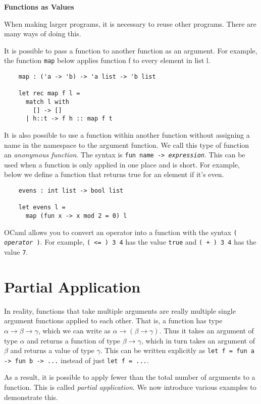 \documentclass[12pt]{article}
\begin{document}
\begin{center}\LARGE\bf
    Functions as Values
\end{center}

When making larger programs, it is necessary to reuse other programs. There are many ways of doing this.

It is possible to pass a function to another function as an argument. For example, the function \texttt{map}
below applies function f to every element in list l.
\begin{lstlisting}
    map : ('a -> 'b) -> 'a list -> 'b list

    let rec map f l =
      match l with
        [] -> []
      | h::t -> f h :: map f t
\end{lstlisting}

It is also possible to use a function within another function without assigning a name in the namespace to the argument function.
We call this type of function an \textit{anonymous function}. The syntax is
\texttt{fun name -> \textit{expression}}. This can be used when a function is only applied in one place and is
short. For example, below we define a function that returns true for an element if it's even.
\begin{lstlisting}
    evens : int list -> bool list

    let evens l =
      map (fun x -> x mod 2 = 0) l
\end{lstlisting}

OCaml allows you to convert an operator into a function with the syntax \texttt{( \textit{operator} )}. For example,
\texttt{( <= ) 3 4} has the value \texttt{true} and \texttt{( + ) 3 4} has the value \texttt{7}.

\section{Partial Application}
In reality, functions that take multiple arguments are really multiple single argument functions applied to
each other. That is, a function  has type $\alpha \rightarrow \beta \rightarrow \gamma$, which we can write as
$\alpha \rightarrow (\beta \rightarrow \gamma)$. Thus it takes an argument of type $\alpha$ and returns a function of type
$\beta \rightarrow \gamma$, which in turn takes an argument of $\beta$ and returns a value of type $\gamma$. This can be written
explicitly as \texttt{let f = fun a -> fun b -> ...} instead of just \texttt{let f = ...}.

As a result, it is possible to apply fewer than the total number of arguments to a function. This is called \textit{partial
application}. We now introduce various examples to demonstrate this.
\end{document}
